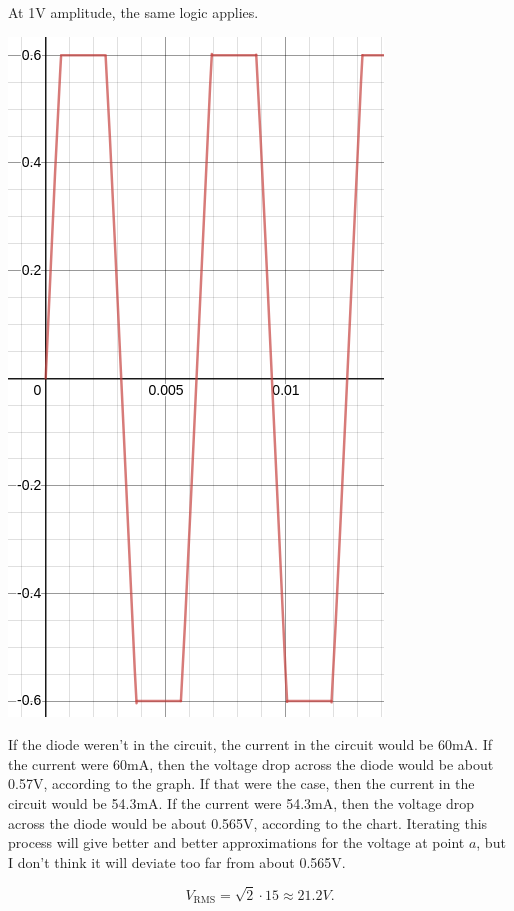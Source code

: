 \documentclass{article}
\begin{document}
\newpage
At 1V amplitude, the same logic applies.
\begin{center}
\includegraphics[scale=.5]{plot3.png}
\end{center}

\newpage{}

If the diode weren't in the circuit, the current in the circuit would be 60mA.
If the current were 60mA, then the voltage drop across the diode would be about 0.57V, according to the graph.
If that were the case, then the current in the circuit would be 54.3mA.
If the current were 54.3mA, then the voltage drop across the diode would be about 0.565V, according to the chart.
Iterating this process will give better and better approximations for the voltage at point $a$, but I don't think it will deviate too far from about 0.565V.

\newpage{}

    $$V_{\text{RMS}} = \sqrt2 \cdot 15 \approx 21.2V.$$
\end{document}

